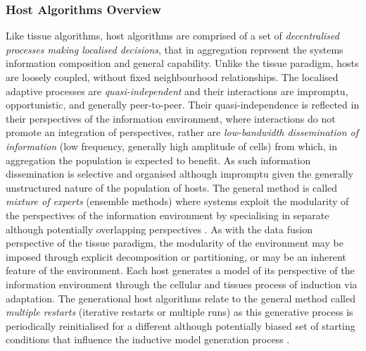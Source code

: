 \subsubsection{Host Algorithms Overview}
Like tissue algorithms, host algorithms are comprised of a set of \emph{decentralised processes making localised decisions}, that in aggregation represent the systems information composition and general capability. Unlike the tissue paradigm, hosts are loosely coupled, without fixed neighbourhood relationships. The localised adaptive processes are \emph{quasi-independent} and their interactions are impromptu, opportunistic, and generally peer-to-peer. Their quasi-independence is reflected in their perspectives of the information environment, where interactions do not promote an integration of perspectives, rather are \emph{low-bandwidth dissemination of information} (low frequency, generally high amplitude of cells) from which, in aggregation the population is expected to benefit. As such information dissemination is selective and organised although impromptu given the generally unstructured nature of the population of hosts.
The general method is called \emph{mixture of experts} (ensemble methods) where systems exploit the modularity of the perspectives of the information environment by specialising in separate although potentially overlapping perspectives \cite{Opitz1999, Polikar2006}. As with the data fusion perspective of the tissue paradigm, the modularity of the environment may be imposed through explicit decomposition or partitioning, or may be an inherent feature of the environment.
Each host generates a model of its perspective of the information environment through the cellular and tissues process of induction via adaptation. The generational host algorithms relate to the general method called \emph{multiple restarts} (iterative restarts or multiple runs) as this generative process is periodically reinitialised for a different although potentially biased set of starting conditions that influence the inductive model generation process \cite{Hu1994, Cantu-Paz2003}.

%
%
